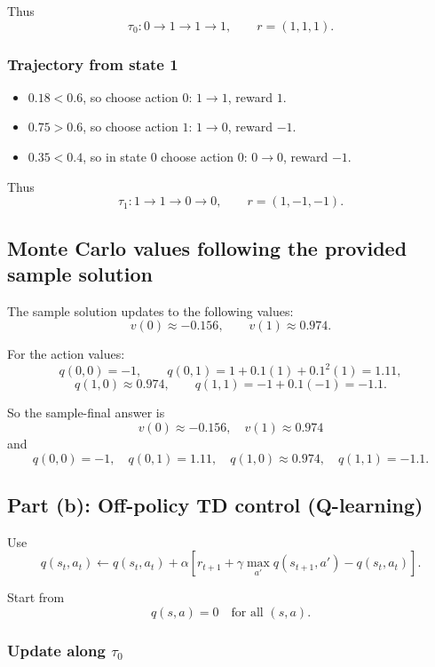 \documentclass[11pt]{article}
\begin{document}
Thus
\[
    \tau_0: 0 \to 1 \to 1 \to 1,
    \qquad
    r = (1,1,1).
\]

\subsubsection*{Trajectory from state 1}

\begin{itemize}
    \item \(0.18 < 0.6\), so choose action \(0\): \(1 \to 1\), reward \(1\).
    \item \(0.75 > 0.6\), so choose action \(1\): \(1 \to 0\), reward \(-1\).
    \item \(0.35 < 0.4\), so in state \(0\) choose action \(0\): \(0 \to 0\), reward \(-1\).
\end{itemize}

Thus
\[
    \tau_1: 1 \to 1 \to 0 \to 0,
    \qquad
    r = (1,-1,-1).
\]

\subsection*{Monte Carlo values following the provided sample solution}

The sample solution updates to the following values:
\[
    v(0)\approx -0.156,
    \qquad
    v(1)\approx 0.974.
\]

For the action values:
\[
    q(0,0)=-1,
    \qquad
    q(0,1)=1+0.1(1)+0.1^2(1)=1.11,
\]
\[
    q(1,0)\approx 0.974,
    \qquad
    q(1,1)=-1+0.1(-1)=-1.1.
\]

So the sample-final answer is
\[
    \boxed{
    v(0)\approx -0.156,\quad
    v(1)\approx 0.974
    }
\]
and
\[
    \boxed{
    q(0,0)=-1,\quad
    q(0,1)=1.11,\quad
    q(1,0)\approx 0.974,\quad
    q(1,1)=-1.1
    }.
\]

\subsection*{Part (b): Off-policy TD control (Q-learning)}

Use
\[
    q(s_t,a_t)\leftarrow q(s_t,a_t)
    + \alpha\left[r_{t+1}+\gamma\max_{a'}q(s_{t+1},a')-q(s_t,a_t)\right].
\]

Start from
\[
    q(s,a)=0\quad \text{for all }(s,a).
\]

\subsubsection*{Update along \(\tau_0\)}
\end{document}
